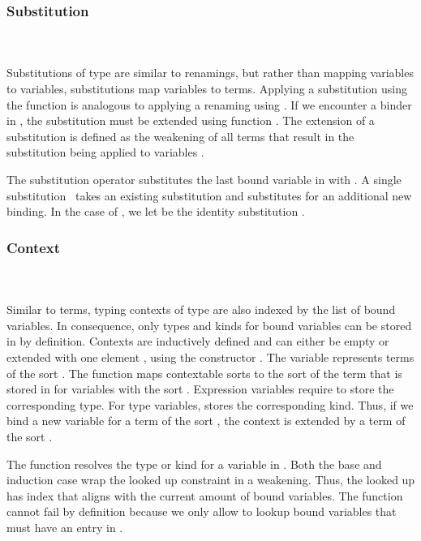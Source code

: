 \subsubsection{Substitution}\hfill\\\\
Substitutions  of type    are similar to renamings, but rather than mapping variables to variables, substitutions map variables to terms.
\FSub
Applying a substitution using the  function is analogous to applying a renaming using . If we encounter a binder in , the substitution must be extended using function .
\Fext
The extension of a substitution is defined as the weakening of all terms that result in the substitution being applied to variables .

\noindent The substitution operator  \Data{[}  \Data{]} substitutes the last bound variable in  with .
\Fsubs
A single substitution \Fsinglesub\ takes an existing substitution  and substitutes  for an additional new binding. In the case of \Data{\_[\_]}, we let  be the identity substitution \Fidsub.

\subsubsection{Context}\hfill\\\\
Similar to terms, typing contexts  of type   are also indexed by the list of bound variables. In consequence, only types and kinds for bound variables can be stored in  by definition.
\FCtx
Contexts are inductively defined and can either be empty  or extended with one element , using the constructor   . The variable  represents terms of the sort  . 
\noindent The function  maps contextable sorts  to the sort of the term that is stored in  for variables with the sort .
\Fkind
Expression variables require  to store the corresponding type. 
For type variables,  stores the corresponding kind. Thus, if we bind a new variable for a term of the sort , the context  is extended by a term of the sort  .

\noindent The  function resolves the type or kind for a variable  in .
\Flookup
Both the base and induction case wrap the looked up constraint in a weakening. Thus, the looked up  has index  that aligns with the current amount of bound variables. The  function cannot fail by definition because we only allow to lookup bound variables that must have an entry in .

